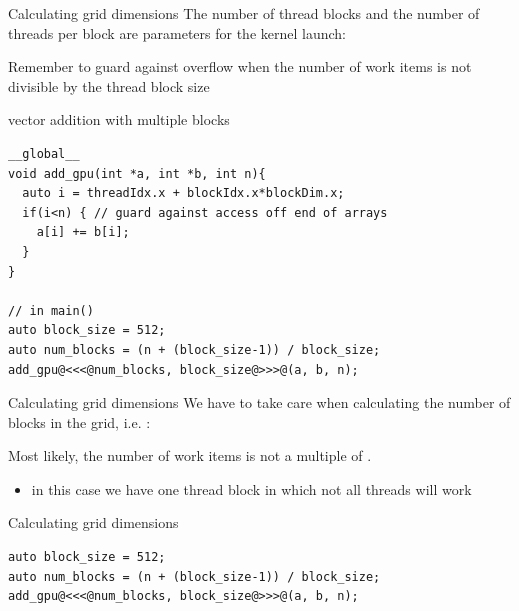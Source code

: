 \begin{frame}[fragile]{}
    \begin{info}{Calculating grid dimensions}
            The number of thread blocks and the number of threads per block are parameters for the kernel launch:
            \begin{center}
            \end{center}
            Remember to guard against overflow when the number of work items is not divisible by the thread block size
    \end{info}

    \begin{code}{vector addition with multiple blocks}
        \begin{lstlisting}[style=boxcudatiny]
__global__
void add_gpu(int *a, int *b, int n){
  auto i = threadIdx.x + blockIdx.x*blockDim.x;
  if(i<n) { // guard against access off end of arrays
    a[i] += b[i];
  }
}

// in main()
auto block_size = 512;
auto num_blocks = (n + (block_size-1)) / block_size;
add_gpu@<<<@num_blocks, block_size@>>>@(a, b, n);
        \end{lstlisting}
    \end{code}
\end{frame}

\begin{frame}[fragile]{}
    \begin{info}{Calculating grid dimensions}
        We have to take care when calculating the number of blocks in the grid, i.e. :
        \begin{center}
        \end{center}
        Most likely, the number of work items  is not a multiple of .
        \begin{itemize}
            \item in this case we have one thread block in which not all threads will work
        \end{itemize}
    \end{info}

    \begin{code}{Calculating grid dimensions}
        \begin{lstlisting}[style=boxcudatiny]
auto block_size = 512;
auto num_blocks = (n + (block_size-1)) / block_size;
add_gpu@<<<@num_blocks, block_size@>>>@(a, b, n);
        \end{lstlisting}
    \end{code}
\end{frame}

